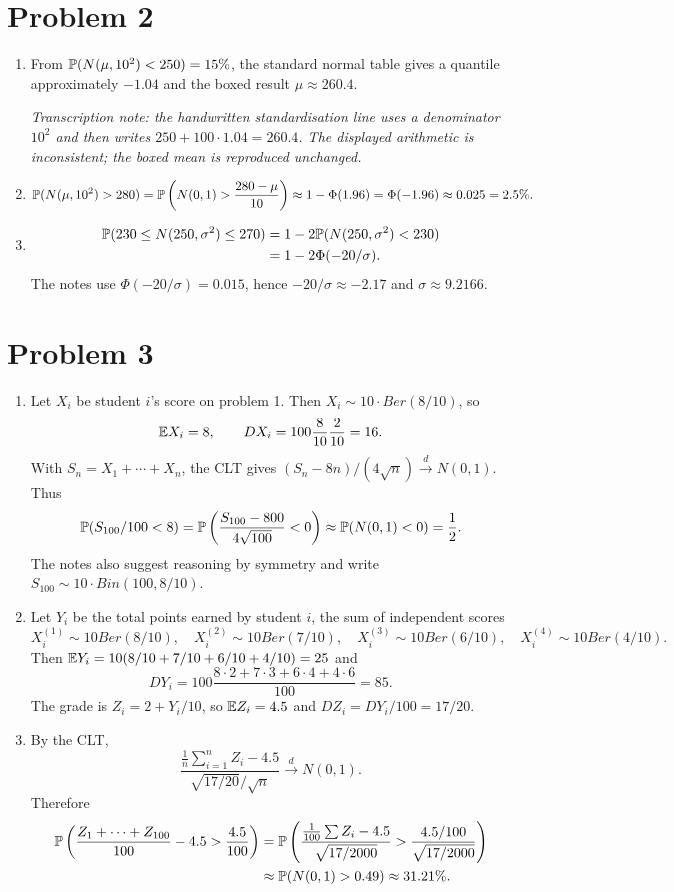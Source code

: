 \documentclass[a4paper]{article}
\begin{document}
\section*{Problem 2}
\begin{enumerate}
\item From $\P(N(\mu,10^2)<250)=15\%$, the standard normal table gives a quantile approximately $-1.04$ and the boxed result $\mu\approx260.4$.
\par\smallskip\textit{Transcription note: the handwritten standardisation line uses a denominator $10^2$ and then writes $250+100\cdot1.04=260.4$. The displayed arithmetic is inconsistent; the boxed mean is reproduced unchanged.}
\item
\[\P(N(\mu,10^2)>280)=\P\left(N(0,1)>\frac{280-\mu}{10}\right)
\approx1-\Phi(1.96)=\Phi(-1.96)\approx0.025=2.5\%.\]
\item
\begin{align*}
\P(230\le N(250,\sigma^2)\le270)
&=1-2\P(N(250,\sigma^2)<230)\\
&=1-2\Phi(-20/\sigma).
\end{align*}
The notes use $\Phi(-20/\sigma)=0.015$, hence $-20/\sigma\approx-2.17$ and $\sigma\approx9.2166$.
\end{enumerate}
\section*{Problem 3}
\begin{enumerate}
\item Let $X_i$ be student $i$'s score on problem 1. Then $X_i\sim10\cdot Ber(8/10)$, so
\[\E X_i=8,\qquad DX_i=100\frac8{10}\frac2{10}=16.\]
With $S_n=X_1+\cdots+X_n$, the CLT gives $(S_n-8n)/(4\sqrt n)\xrightarrow{d}N(0,1)$. Thus
\[\P(S_{100}/100<8)=\P\left(\frac{S_{100}-800}{4\sqrt{100}}<0\right)\approx\P(N(0,1)<0)=\frac12.\]
The notes also suggest reasoning by symmetry and write $S_{100}\sim10\cdot Bin(100,8/10)$.
\item Let $Y_i$ be the total points earned by student $i$, the sum of independent scores
\[X_i^{(1)}\sim10Ber(8/10),\quad X_i^{(2)}\sim10Ber(7/10),\quad X_i^{(3)}\sim10Ber(6/10),\quad X_i^{(4)}\sim10Ber(4/10).\]
Then $\E Y_i=10(8/10+7/10+6/10+4/10)=25$ and
\[DY_i=100\frac{8\cdot2+7\cdot3+6\cdot4+4\cdot6}{100}=85.\]
The grade is $Z_i=2+Y_i/10$, so $\E Z_i=4.5$ and $DZ_i=DY_i/100=17/20$.
\item By the CLT,
\[\frac{\frac1n\sum_{i=1}^nZ_i-4.5}{\sqrt{17/20}/\sqrt n}\xrightarrow{d}N(0,1).\]
Therefore
\begin{align*}
\P\left(\frac{Z_1+\cdots+Z_{100}}{100}-4.5>\frac{4.5}{100}\right)
&=\P\left(\frac{\frac1{100}\sum Z_i-4.5}{\sqrt{17/2000}}>\frac{4.5/100}{\sqrt{17/2000}}\right)\\
&\approx\P(N(0,1)>0.49)\approx31.21\%.
\end{align*}
\end{enumerate}
\end{document}
